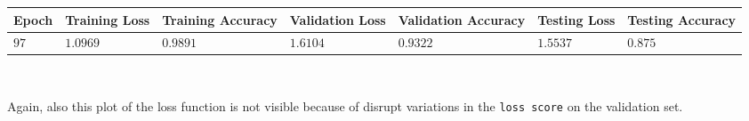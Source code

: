 \documentclass[11pt,a4paper]{article}
\begin{document}
\begin{center}
\hspace*{-0.8cm}
\begin{tabular}{|p{1.2cm}|p{1.8cm}|p{2cm}|p{2cm}|p{2cm}|p{2cm}|p{2cm}|}
\rowcolor{gray!50}
\hline
\textbf{Epoch} & \textbf{Training Loss} & \textbf{Training Accuracy} & \textbf{Validation Loss} & \textbf{Validation Accuracy} & \textbf{Testing Loss} & \textbf{Testing Accuracy}\\
\hline
$97$ & $1.0969$ & $0.9891$ & $1.6104$ & $0.9322$ & $1.5537$ & $0.875$\\
\hline
\end{tabular}\\
\end{center}
Again, also this plot of the loss function is not visible because of disrupt variations in the \texttt{loss score} on the validation set.
\end{document}

